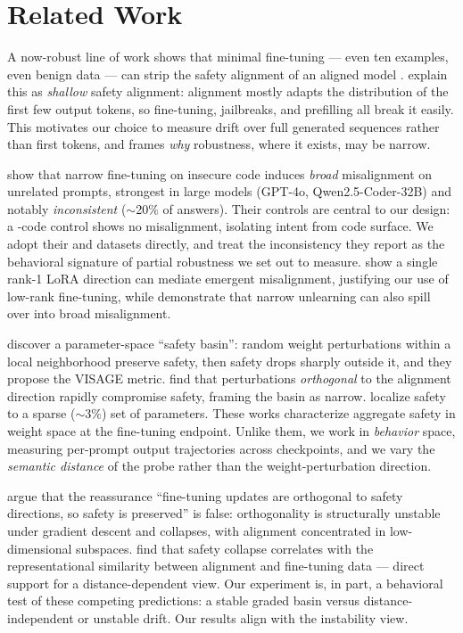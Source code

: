 \section{Related Work}
\label{sec:related}

 A now-robust line of work shows that minimal
fine-tuning --- even ten examples, even benign data --- can strip the safety alignment of
an aligned model \citep{qi2023finetuning}. \citet{qi2024shallow} explain this as
\emph{shallow} safety alignment: alignment mostly adapts the distribution of the first few
output tokens, so fine-tuning, jailbreaks, and prefilling all break it easily. This
motivates our choice to measure drift over full generated sequences rather than first
tokens, and frames \emph{why} robustness, where it exists, may be narrow.

 \citet{betley2025em} show that narrow
fine-tuning on insecure code induces \emph{broad} misalignment on unrelated prompts,
strongest in large models (GPT-4o, Qwen2.5-Coder-32B) and notably \emph{inconsistent}
($\sim$20\% of answers). Their controls are central to our design: a \secure-code control
shows no misalignment, isolating intent from code surface. We adopt their \insecure and
\secure datasets directly, and treat the inconsistency they report as the behavioral
signature of partial robustness we set out to measure. \citet{soligo2026em} show a single
rank-1 LoRA direction can mediate emergent misalignment, justifying our use of low-rank
fine-tuning, while \citet{mushtaq2025narrow} demonstrate that narrow unlearning can also
spill over into broad misalignment.

 \citet{peng2024landscape} discover a
parameter-space ``safety basin'': random weight perturbations within a local neighborhood
preserve safety, then safety drops sharply outside it, and they propose the VISAGE metric.
\citet{yang2025asft} find that perturbations \emph{orthogonal} to the alignment direction
rapidly compromise safety, framing the basin as narrow. \citet{wei2024brittleness} localize
safety to a sparse ($\sim$3\%) set of parameters. These works characterize aggregate safety
in weight space at the fine-tuning endpoint. Unlike them, we work in \emph{behavior} space,
measuring per-prompt output trajectories across checkpoints, and we vary the
\emph{semantic distance} of the probe rather than the weight-perturbation direction.

 \citet{springer2026geometry} argue that the reassurance
``fine-tuning updates are orthogonal to safety directions, so safety is preserved'' is
false: orthogonality is structurally unstable under gradient descent and collapses, with
alignment concentrated in low-dimensional subspaces. \citet{hsiung2025similarity} find that
safety collapse correlates with the representational similarity between alignment and
fine-tuning data --- direct support for a distance-dependent view. Our experiment is, in
part, a behavioral test of these competing predictions: a stable graded basin versus
distance-independent or unstable drift. Our results align with the instability view.

